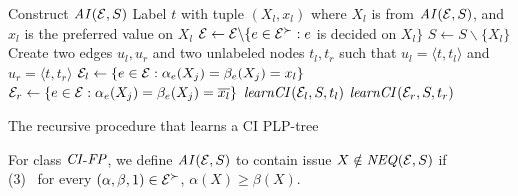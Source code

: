 \begin{algorithm}[ht]
	Construct $\mathit{AI}(\mathcal{E},S)$\;
	Label $t$ with tuple $(X_l,x_l)$ where $X_l$ is from $\mathit{AI}(\mathcal{E},S)$, 
		and $x_l$ is the preferred value on $X_l$\;
	$\mathcal{E} \leftarrow \mathcal{E} \backslash \{e \in \mathcal{E}^\succ: e$ is decided on $X_l\}$\;
	$S \leftarrow S \backslash \{X_l\}$\;
	Create two edges $u_l,u_r$ and two unlabeled nodes $t_l,t_r$ such that $u_l=\langle t,t_l\rangle$
		and $u_r=\langle t,t_r\rangle$\;
	$\mathcal{E}_l \leftarrow \{e\in \mathcal{E}: \alpha_e(X_j)=\beta_e(X_j)=x_l\}$\;
	$\mathcal{E}_r \leftarrow \{e\in \mathcal{E}: \alpha_e(X_j)=\beta_e(X_j)=\overline{x_l}\}$\;
	$\mathit{learnCI}(\mathcal{E}_l,S,t_l)$\;
	$\mathit{learnCI}(\mathcal{E}_r,S,t_r)$\;

\caption{The recursive procedure  that learns a CI PLP-tree \label{alg:recur_learnCI}}
\end{algorithm}

For class $\textit{CI}$-$\textit{FP}$, we define $\mathit{AI}(\mathcal{E},S)$ to contain issue 
$X\notin \mathit{NEQ}(\mathcal{E},S)$ if\\
(3) \ for every $(\alpha,\beta,1) \in \mathcal{E}^\succ$,  $\alpha(X) \geq \beta(X)$.

